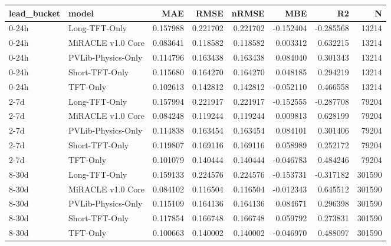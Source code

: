 \begin{tabular}{llrrrrrr}
\toprule
lead_bucket & model & MAE & RMSE & nRMSE & MBE & R2 & N \\
\midrule
0-24h & Long-TFT-Only & 0.157988 & 0.221702 & 0.221702 & -0.152404 & -0.285568 & 13214 \\
0-24h & MiRACLE v1.0 Core & 0.083641 & 0.118582 & 0.118582 & 0.003312 & 0.632215 & 13214 \\
0-24h & PVLib-Physics-Only & 0.114796 & 0.163438 & 0.163438 & 0.084040 & 0.301343 & 13214 \\
0-24h & Short-TFT-Only & 0.115680 & 0.164270 & 0.164270 & 0.048185 & 0.294219 & 13214 \\
0-24h & TFT-Only & 0.102613 & 0.142812 & 0.142812 & -0.052110 & 0.466558 & 13214 \\
2-7d & Long-TFT-Only & 0.157994 & 0.221917 & 0.221917 & -0.152555 & -0.287708 & 79204 \\
2-7d & MiRACLE v1.0 Core & 0.084248 & 0.119244 & 0.119244 & 0.009813 & 0.628199 & 79204 \\
2-7d & PVLib-Physics-Only & 0.114838 & 0.163454 & 0.163454 & 0.084101 & 0.301406 & 79204 \\
2-7d & Short-TFT-Only & 0.119807 & 0.169116 & 0.169116 & 0.058989 & 0.252172 & 79204 \\
2-7d & TFT-Only & 0.101079 & 0.140444 & 0.140444 & -0.046783 & 0.484246 & 79204 \\
8-30d & Long-TFT-Only & 0.159133 & 0.224576 & 0.224576 & -0.153731 & -0.317182 & 301590 \\
8-30d & MiRACLE v1.0 Core & 0.084102 & 0.116504 & 0.116504 & -0.012343 & 0.645512 & 301590 \\
8-30d & PVLib-Physics-Only & 0.115109 & 0.164136 & 0.164136 & 0.084671 & 0.296398 & 301590 \\
8-30d & Short-TFT-Only & 0.117854 & 0.166748 & 0.166748 & 0.059792 & 0.273831 & 301590 \\
8-30d & TFT-Only & 0.100663 & 0.140002 & 0.140002 & -0.046970 & 0.488097 & 301590 \\
\bottomrule
\end{tabular}
